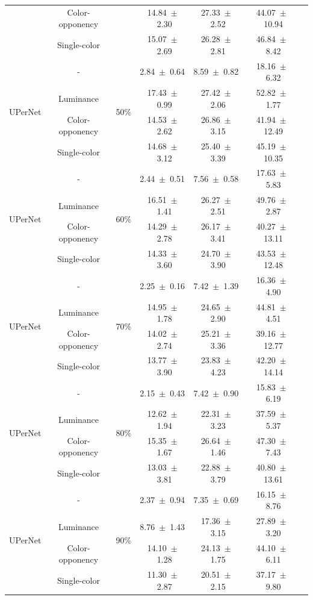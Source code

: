 \begin{table}[h]
\begin{tabular}{@{}lccc ccc@{}}
& Color-opponency & & 14.84~$\pm$~2.30 & 27.33~$\pm$~2.52 & 44.07~$\pm$~10.94 \\
& Single-color & & 15.07~$\pm$~2.69 & 26.28~$\pm$~2.81 & 46.84~$\pm$~8.42 \\
\midrule
\multirow{4}{*}{UPerNet} & - & \multirow{4}{*}{50\%} & 2.84~$\pm$~0.64 & 8.59~$\pm$~0.82 & 18.16~$\pm$~6.32 \\
& Luminance & & 17.43~$\pm$~0.99 & 27.42~$\pm$~2.06 & 52.82~$\pm$~1.77 \\
& Color-opponency & & 14.53~$\pm$~2.62 & 26.86~$\pm$~3.15 & 41.94~$\pm$~12.49 \\
& Single-color & & 14.68~$\pm$~3.12 & 25.40~$\pm$~3.39 & 45.19~$\pm$~10.35 \\
\midrule
\multirow{4}{*}{UPerNet} & - & \multirow{4}{*}{60\%} & 2.44~$\pm$~0.51 & 7.56~$\pm$~0.58 & 17.63~$\pm$~5.83 \\
& Luminance & & 16.51~$\pm$~1.41 & 26.27~$\pm$~2.51 & 49.76~$\pm$~2.87 \\
& Color-opponency & & 14.29~$\pm$~2.78 & 26.17~$\pm$~3.41 & 40.27~$\pm$~13.11 \\
& Single-color & & 14.33~$\pm$~3.60 & 24.70~$\pm$~3.90 & 43.53~$\pm$~12.48 \\
\midrule
\multirow{4}{*}{UPerNet} & - & \multirow{4}{*}{70\%} & 2.25~$\pm$~0.16 & 7.42~$\pm$~1.39 & 16.36~$\pm$~4.90 \\
& Luminance & & 14.95~$\pm$~1.78 & 24.65~$\pm$~2.90 & 44.81~$\pm$~4.51 \\
& Color-opponency & & 14.02~$\pm$~2.74 & 25.21~$\pm$~3.36 & 39.16~$\pm$~12.77 \\
& Single-color & & 13.77~$\pm$~3.90 & 23.83~$\pm$~4.23 & 42.20~$\pm$~14.14 \\
\midrule
\multirow{4}{*}{UPerNet} & - & \multirow{4}{*}{80\%} & 2.15~$\pm$~0.43 & 7.42~$\pm$~0.90 & 15.83~$\pm$~6.19 \\
& Luminance & & 12.62~$\pm$~1.94 & 22.31~$\pm$~3.23 & 37.59~$\pm$~5.37 \\
& Color-opponency & & 15.35~$\pm$~1.67 & 26.64~$\pm$~1.46 & 47.30~$\pm$~7.43 \\
& Single-color & & 13.03~$\pm$~3.81 & 22.88~$\pm$~3.79 & 40.80~$\pm$~13.61 \\
\midrule
\multirow{4}{*}{UPerNet} & - & \multirow{4}{*}{90\%} & 2.37~$\pm$~0.94 & 7.35~$\pm$~0.69 & 16.15~$\pm$~8.76 \\
& Luminance & & 8.76~$\pm$~1.43 & 17.36~$\pm$~3.15 & 27.89~$\pm$~3.20 \\
& Color-opponency & & 14.10~$\pm$~1.28 & 24.13~$\pm$~1.75 & 44.10~$\pm$~6.11 \\
& Single-color & & 11.30~$\pm$~2.87 & 20.51~$\pm$~2.15 & 37.17~$\pm$~9.80 \\
\midrule
\bottomrule
\end{tabular}
\label{tab:sparse_results_upernet_acdc_night}
\end{table}